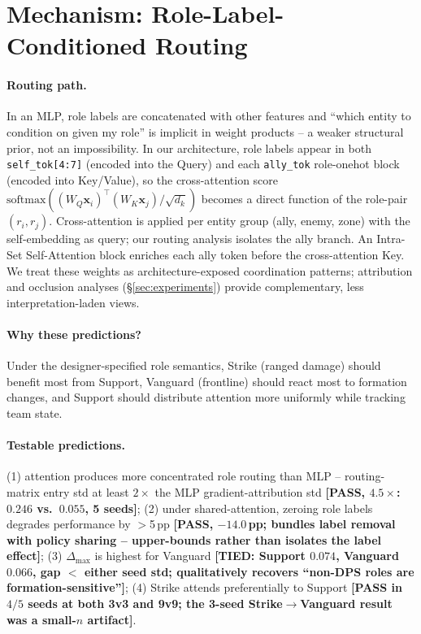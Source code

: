 \documentclass{nextgame2026}
\begin{document}
\section{Mechanism: Role-Label-Conditioned Routing}
\label{sec:theory}

\paragraph{Routing path.} In an MLP, role labels are concatenated with other features and ``which entity to condition on given my role'' is implicit in weight products -- a weaker structural prior, not an impossibility. In our architecture, role labels appear in both \texttt{self\_tok[4:7]} (encoded into the Query) and each \texttt{ally\_tok} role-onehot block (encoded into Key/Value), so the cross-attention score $\text{softmax}((W_Q \mathbf{x}_i)^\top(W_K \mathbf{x}_j)/\sqrt{d_k})$ becomes a direct function of the role-pair $(r_i,r_j)$. Cross-attention is applied per entity group (ally, enemy, zone) with the self-embedding as query; our routing analysis isolates the ally branch. An Intra-Set Self-Attention block enriches each ally token before the cross-attention Key. We treat these weights as architecture-exposed coordination patterns; attribution and occlusion analyses (\S\ref{sec:experiments}) provide complementary, less interpretation-laden views.

\paragraph{Why these predictions?} Under the designer-specified role semantics, Strike (ranged damage) should benefit most from Support, Vanguard (frontline) should react most to formation changes, and Support should distribute attention more uniformly while tracking team state.

\paragraph{Testable predictions.} (1) attention produces more concentrated role routing than MLP -- routing-matrix entry std at least $2\times$ the MLP gradient-attribution std \textbf{[PASS, $4.5\times$: $0.246$ vs.\ $0.055$, 5 seeds]}; (2) under shared-attention, zeroing role labels degrades performance by $>$5\,pp \textbf{[PASS, $-14.0$\,pp; bundles label removal with policy sharing -- upper-bounds rather than isolates the label effect]}; (3) $\Delta_{\max}$ is highest for Vanguard \textbf{[TIED: Support $0.074$, Vanguard $0.066$, gap $<$ either seed std; qualitatively recovers ``non-DPS roles are formation-sensitive'']}; (4) Strike attends preferentially to Support \textbf{[PASS in $4/5$ seeds at both 3v3 and 9v9; the 3-seed Strike$\to$Vanguard result was a small-$n$ artifact]}.
\end{document}
